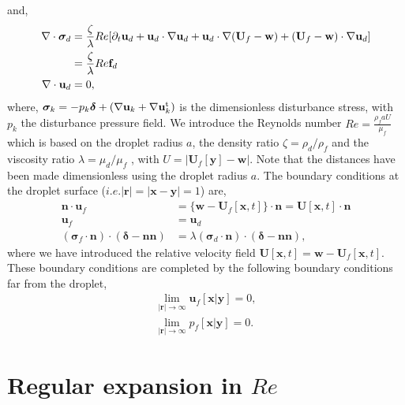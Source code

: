 and, 
\begin{align*}
    \mathbf{\nabla}\cdot\bm\sigma_d
    &= 
    \frac{\zeta}{\lambda}Re [
    \partial_t \textbf{u}_d
    + \textbf{u}_d\cdot \mathbf{\nabla} \textbf{u}_d
    + \textbf{u}_d\cdot \mathbf{\nabla} (\textbf{U}_f - \textbf{w})
    + (\textbf{U}_f - \textbf{w})\cdot \mathbf{\nabla} \textbf{u}_d]\\
    &= \frac{\zeta}{\lambda}Re \textbf{f}_d\\
    \mathbf{\nabla}\cdot \textbf{u}_d &= 0,
\end{align*}
where, $\bm\sigma_{k} = -p_{k}\bm\delta + (\mathbf{\nabla} \textbf{u}_{k} + \mathbf{\nabla} \textbf{u}_{k}^{\text{t}})$ is the dimensionless disturbance stress, with $p_k$ the disturbance pressure field. 
We introduce the Reynolds number $Re = \frac{\rho_f a U}{\mu_f}$ which is based on the droplet radius $a$, the density ratio $\zeta = \rho_d / \rho_f$ and the viscosity ratio $\lambda = \mu_d / \mu_f$ , with $U = |\textbf{U}_f[\textbf{y}] - \textbf{w}|$. 
Note that the distances have been made dimensionless using the droplet radius $a$. 
The boundary conditions at the droplet surface ($i.e. |\textbf{r}| = |\textbf{x} - \textbf{y}| = 1$) are, 
\begin{align}
    \textbf{n}\cdot\textbf{u}_f
    &= \{\textbf{w} - \textbf{U}_f[\textbf{x},t]\}\cdot \textbf{n} 
    = \textbf{U}[\textbf{x},t]\cdot \textbf{n} \\
    \textbf{u}_f &= \textbf{u}_d\\
    (\bm\sigma_f\cdot\textbf{n})\cdot (\bm\delta - \textbf{nn})
    &= \lambda (\bm\sigma_d\cdot \textbf{n})\cdot (\bm\delta - \textbf{nn}),
    \label{eq:bc_stress_orig}
\end{align}
where we have introduced the relative velocity field $\textbf{U}[\textbf{x},t] = \textbf{w} - \textbf{U}_f[\textbf{x},t]$. 
These boundary conditions are completed by the following boundary conditions far from the droplet,
\begin{align*}
    \lim_{|\textbf{r}|\to\infty }\textbf{u}_f[\textbf{x}|\textbf{y}] = 0,\\
    \lim_{|\textbf{r}|\to\infty }p_f[\textbf{x}|\textbf{y}] = 0. 
\end{align*}

\section{Regular expansion in $Re$} %

